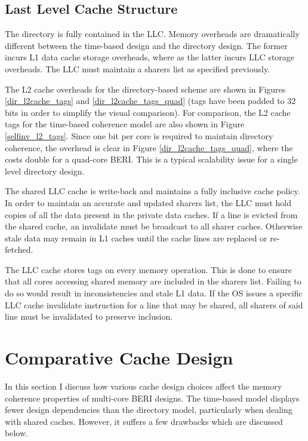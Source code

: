 	\subsection{Last Level Cache Structure}
		\label{dir_llc_structure}
		The directory is fully contained in the LLC. Memory overheads are dramatically different between the time-based design and the directory design. The former incurs L1 data cache storage overheads, where as the latter incurs LLC storage overheads. The LLC must maintain a sharers list as specified previously. 
		
		The L2 cache overheads for the directory-based scheme are shown in Figures \ref{dir_l2cache_tags} and \ref{dir_l2cache_tags_quad} (tags have been padded to 32 bits in order to simplify the visual comparison). For comparison, the L2 cache tags for the time-based coherence model are also shown in Figure \ref{selfinv_l2_tags}. Since one bit per core is required to maintain directory coherence, the overhead is clear in Figure \ref{dir_l2cache_tags_quad}, where the costs double for a quad-core BERI. This is a typical scalability issue for a single level directory design.
		
		The shared LLC cache is write-back and maintains a fully inclusive cache policy. In order to maintain an accurate and updated sharers list, the LLC must hold copies of all the data present in the private data caches. 
		If a line is evicted from the shared cache, an invalidate must be broadcast to all sharer caches. Otherwise stale data may remain in L1 caches until the cache lines are replaced or re-fetched.
		
		The LLC cache stores tags on every memory operation. This is done to ensure that all cores accessing shared memory are included in the sharers list. 
		Failing to do so would result in inconsistencies and stale L1 data. If the OS issues a specific LLC cache invalidate instruction for a line that may be shared, all sharers of said line must be invalidated to preserve inclusion.

\clearpage
\section{Comparative Cache Design}
	\label{section_cache_properties}
	In this section I discuss how various cache design choices affect the memory coherence properties of multi-core BERI designs. The time-based model displays fewer design dependencies than the directory model, particularly when dealing with shared caches. However, it suffers a few drawbacks which are discussed below.

